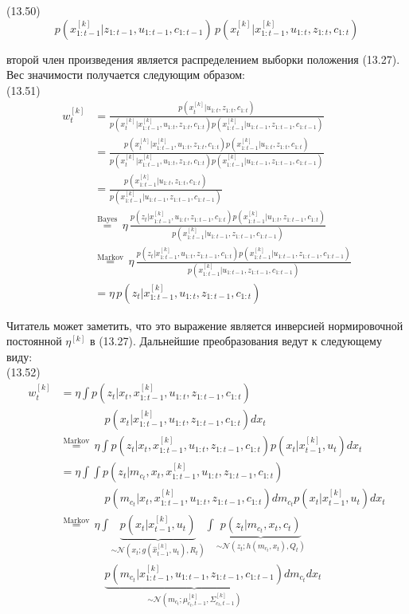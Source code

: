 \documentclass[10pt,a4paper]{article}
\begin{document}
(13.50)
$$p(x_{1:t-1}^{[k]}|z_{1:t-1}, u_{1:t-1}, c_{1:t-1})\,p(x_t^{[k]}|x_{1:t-1}^{[k]},u_{1:t}, z_{1:t}, c_{1:t})$$

второй член произведения является распределением выборки положения (13.27). Вес значимости получается следующим образом:\\

(13.51)
\begin{equation*}
\begin{split}
w_t^{[k]}&=\frac{p(x_t^{[k]}|u_{1:t}, z_{1:t}, c_{1:t})}{p(x_t^{[k]}|x_{1:t-1}^{[k]},u_{1:t}, z_{1:t}, c_{1:t})p(x_{1:t-1}^{[k]}|u_{1:t-1},z_{1:t-1},c_{1:t-1})}\\
&=\frac{p(x_t^{[k]}|x_{1:t-1}^{[k]},u_{1:t}, z_{1:t}, c_{1:t})p(x_{1:t-1}^{[k]}|u_{1:t},z_{1:t},c_{1:t})}{p(x_t^{[k]}|x_{1:t-1}^{[k]},u_{1:t}, z_{1:t}, c_{1:t})p(x_{1:t-1}^{[k]}|u_{1:t-1},z_{1:t-1},c_{1:t-1})}\\
&=\frac{p(x_{1:t-1}^{[k]}|u_{1:t},z_{1:t},c_{1:t})}{p(x_{1:t-1}^{[k]}|u_{1:t-1},z_{1:t-1},c_{1:t-1})}\\
&\overset{\text{Bayes}}{=}\,\eta\,\frac{p(z_t|x_{1:t-1}^{[k]},u_{1:t}, z_{1:t-1}, c_{1:t})p(x_{1:t-1}^{[k]}|u_{1:t},z_{1:t-1},c_{1:t})}{p(x_{1:t-1}^{[k]}|u_{1:t-1},z_{1:t-1},c_{1:t-1})}\\
&\overset{\text{Markov}}{=}\,\eta\,\frac{p(z_t|x_{1:t-1}^{[k]},u_{1:t}, z_{1:t-1}, c_{1:t})p(x_{1:t-1}^{[k]}|u_{1:t-1},z_{1:t-1},c_{1:t-1})}{p(x_{1:t-1}^{[k]}|u_{1:t-1},z_{1:t-1},c_{1:t-1})}\\
&=\eta\,p(z_t|x_{1:t-1}^{[k]},u_{1:t}, z_{1:t-1}, c_{1:t})
\end{split}
\end{equation*}

Читатель может заметить, что это выражение является инверсией нормировочной постоянной $\eta^{[k]}$ в (13.27). Дальнейшие преобразования ведут к следующему виду:\\

(13.52)
\begin{equation*}
\begin{split}
w_t^{[k]}&=\eta\int p(z_t|x_t,x_{1:t-1}^{[k]},u_{1:t},z_{1:t-1},c_{1:t})\\
&\qquad\qquad p(x_t|x_{1:t-1}^{[k]},u_{1:t},z_{1:t-1},c_{1:t})dx_t\\
&\overset{\text{Markov}}{=}\,\eta\int p(z_t|x_t,x_{1:t-1}^{[k]},u_{1:t},z_{1:t-1},c_{1:t})p(x_t|x_{t-1}^{[k]},u_t)dx_t\\
&=\eta\int\int p(z_t|m_{c_t},x_t,x_{1:t-1}^{[k]},u_{1:t},z_{1:t-1},c_{1:t})\\
&\qquad\qquad p(m_{c_t}|x_t,x_{1:t-1}^{[k]},u_{1:t},z_{1:t-1},c_{1:t})dm_{c_t}p(x_t|x_{t-1}^{[k]},u_t)dx_t\\
&\overset{\text{Markov}}{=}\,\eta\int\underbrace{p(x_t|x_{t-1}^{[k]},u_t)}_{\sim\mathcal{N}(x_t;g(\hat{x}_{t-1}^{[k]},u_t),R_t)}\int\underbrace{p(z_t|m_{c_t},x_t,c_t)}_{\sim\mathcal{N}(z_t;h(m_{c_t},x_t),Q_t)}\\
&\qquad\qquad\underbrace{p(m_{c_t}|x_{1:t-1}^{[k]},u_{1:t-1},z_{1:t-1},c_{1:t-1})}_{\sim\mathcal{N}(m_{c_t};\mu_{c_t,t-1}^{[k]},\varSigma_{c_t,t-1}^{[k]})}dm_{c_t}dx_t
\end{split}
\end{equation*}
\end{document}
